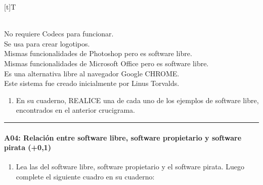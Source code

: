 \documentclass[letterpaper,10pt,spanish]{sphinxmanual}
\let\sphinxpxdimen\pdfpxdimen\else\newdimen\sphinxpxdimen
\begin{document}
\begin{savenotes}\sphinxattablestart
\sphinxthistablewithglobalstyle
\centering
\begin{tabulary}{\linewidth}[t]{T}
\sphinxtoprule
\sphinxtableatstartofbodyhook

\begin{sphinxfigure-in-table}
\centering
\capstart
\noindent\sphinxincludegraphics[width=500\sphinxpxdimen]{{image013}.png}
\label{\detokenize{cursos/ofimatica10/periodo01/G02:id1}}\end{sphinxfigure-in-table}\relax
\\
\sphinxhline
\sphinxAtStartPar
{} No requiere Codecs para funcionar.
\\
\sphinxhline
\sphinxAtStartPar
{} Se usa para crear logotipos.
\\
\sphinxhline
\sphinxAtStartPar
{} Mismas funcionalidades de Photoshop pero es software libre.
\\
\sphinxhline
\sphinxAtStartPar
{} Mismas funcionalidades de Microsoft Office pero es software libre.
\\
\sphinxhline
\sphinxAtStartPar
{} Es una alternativa libre al navegador Google CHROME.
\\
\sphinxhline
\sphinxAtStartPar
{} Este sistema fue creado inicialmente por Linus Torvalds.
\\
\sphinxbottomrule
\end{tabulary}
\sphinxtableafterendhook\par
\sphinxattableend\end{savenotes}
\begin{enumerate}
%
\setcounter{enumi}{1}
\item {} 
\sphinxAtStartPar
En su cuaderno, REALICE una  de cada uno de los ejemplos de software libre, encontrados en el anterior crucigrama.

\end{enumerate}


\bigskip\hrule\bigskip



\paragraph{A04: Relación entre software libre, software propietario y software pirata (+0,1)}
\label{\detokenize{cursos/ofimatica10/periodo01/G02:a04-relacion-entre-software-libre-software-propietario-y-software-pirata-0-1}}
\sphinxAtStartPar
{}
\begin{enumerate}
%
\item {} 
\sphinxAtStartPar
Lea las  del software libre, software propietario y el software pirata. Luego complete el siguiente cuadro en su cuaderno:

\end{enumerate}
\end{document}
